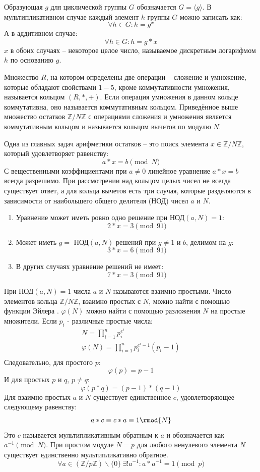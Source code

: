 \documentclass[times,specification,annotation]{itmo-student-thesis}
\begin{document}
Образующая $g$ для циклической группы $G$ обозначается $G=\langle g \rangle$.
В мультипликативном случае каждый элемент $h$ группы $G$ можно записать как:
\[\forall h \in G: h=g^x\]
А в аддитивном случае:
\[\forall h \in G: h=g*x\]
$x$ в обоих случаях -- некоторое целое число, называемое дискретным логарифмом $h$ по основанию $g$.

Множество $R$, на котором определены две операции -- сложение и умножение, которые обладают свойствами
$1-5$, кроме коммутативности умножения, называется кольцом $(R,*,+)$.
Если операция умножения в данном кольце коммутативна, оно называется коммутативным кольцом.
Приведённое выше множество остатков $\mathbb{Z}/N\mathbb{Z}$ с операциями сложения и умножения
является коммутативным кольцом и называется кольцом вычетов по модулю $N$.

Одна из главных задач арифметики остатков -- это поиск элемента $x\in\mathbb{Z}/N\mathbb{Z}$, который удовлетворяет равенству:
\[a*x=b\pmod{N}\]
С вещественными коэффициентами при $a \neq 0$ линейное уравнение $a*x=b$ всегда разрешимо.
При рассмотрении над кольцом целых чисел не всегда существует ответ, а для кольца вычетов есть три случая,
которые разделяются в зависимости от наибольшего общего делителя (НОД) чисел $a$ и $N$.
\begin{enumerate}[label=\arabic*.]
    \item Уравнение может иметь ровно одно решение при НОД$(a,N) = 1$:
    \[2*x=3\pmod{91}\]
    \item Может иметь $g = $ НОД$(a,N)$ решений при $g \neq 1$ и $b$, делимом на $g$:
    \[3*x=6\pmod{91}\]
    \item В других случаях уравнение решений не имеет:
    \[7*x=3\pmod{91}\]
\end{enumerate}

При НОД$(a,N) = 1$ числа $a$ и $N$ называются взаимно простыми.
Число элементов кольца $\mathbb{Z}/N\mathbb{Z}$, взаимно простых с $N$, можно найти с помощью функции Эйлера \varphi.
$\varphi(N)$ можно найти с помощью разложения $N$ на простые множители.
Если $p_i$ - различные простые числа:
\begin{gather*}
    N = \prod_{i=1}^n p_i^{e^i}\\
    \varphi(N) = \prod_{i=1}^n p_i^{e^i-1}(p_i-1)\\
\end{gather*}
Следовательно, для простого $p$:
\[\varphi(p) = p-1\]
И для простых $p$ и $q$, $p \neq q$:
\[\varphi(p*q) = (p-1)*(q-1)\]
Для взаимно простых $a$ и $N$ существует единственное $c$, удовлетворяющее следующему равенству:
\[a*c \equiv c*a \equiv 1 \rmod{N}\]
Это $c$ называется мультипликативным обратным к $a$ и обозначается как $a^{-1} \pmod{N}$.
При простом модуле $N=p$ для любого ненулевого элемента $N$ существует единственно мультипликативно обратное.
\[ \forall a \in (\mathbb{Z}/p\mathbb{Z}) \backslash \{0\} ~ \exists! a^{-1}: a*a^{-1} = 1 \pmod{p}\]
\end{document}

